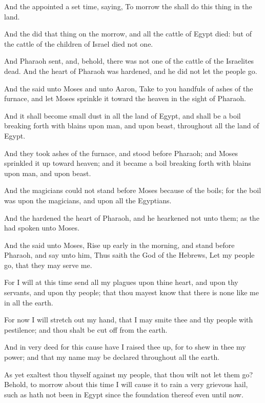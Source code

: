 \verse And the \LORD appointed a set time, saying, To morrow the \LORD
shall do this thing in the land.

\verse And the \LORD did that thing on the morrow, and all the cattle of
Egypt died: but of the cattle of the children of Israel died not one.

\verse And Pharaoh sent, and, behold, there was not one of the cattle of
the Israelites dead. And the heart of Pharaoh was hardened, and he did
not let the people go.

\verse And the \LORD said unto Moses and unto Aaron, Take to you handfuls
of ashes of the furnace, and let Moses sprinkle it toward the heaven
in the sight of Pharaoh.

\verse And it shall become small dust in all the land of Egypt, and shall
be a boil breaking forth with blains upon man, and upon beast,
throughout all the land of Egypt.

\verse And they took ashes of the furnace, and stood before Pharaoh; and
Moses sprinkled it up toward heaven; and it became a boil breaking
forth with blains upon man, and upon beast.

\verse And the magicians could not stand before Moses because of the
boils; for the boil was upon the magicians, and upon all the
Egyptians.

\verse And the \LORD hardened the heart of Pharaoh, and he hearkened not
unto them; as the \LORD had spoken unto Moses.

\verse And the \LORD said unto Moses, Rise up early in the morning, and
stand before Pharaoh, and say unto him, Thus saith the \LORD God of the
Hebrews, Let my people go, that they may serve me.

\verse For I will at this time send all my plagues upon thine heart, and
upon thy servants, and upon thy people; that thou mayest know that
there is none like me in all the earth.

\verse For now I will stretch out my hand, that I may smite thee and thy
people with pestilence; and thou shalt be cut off from the earth.

\verse And in very deed for this cause have I raised thee up, for to
shew in thee my power; and that my name may be declared throughout all
the earth.

\verse As yet exaltest thou thyself against my people, that thou wilt
not let them go?  \verse Behold, to morrow about this time I will cause
it to rain a very grievous hail, such as hath not been in Egypt since
the foundation thereof even until now.

